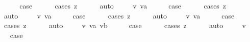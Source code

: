 \begin{isabellebody}
\ \ \isamarkupfalse%
\ \isamarkupfalse%
\ {\isacharquery}case\isanewline
\ \ \ \ \isamarkupfalse%
\ {\isacharparenleft}cases\ z{\isacharparenright}\isanewline
\ \ \ \ \isamarkupfalse%
\ auto\isanewline
{}\isamarkupfalse%
\isanewline
\ \ \isamarkupfalse%
\ {\isacharparenleft}{\isachardoublequoteopen}{}{\isacharunderscore}{}{\isachardoublequoteclose}\ v\ va{\isacharparenright}\isanewline
\ \ \isamarkupfalse%
\ \isamarkupfalse%
\ {\isacharquery}case\isanewline
\ \ \ \ \isamarkupfalse%
\ {\isacharparenleft}cases\ z{\isacharparenright}\isanewline
\ \ \ \ \isamarkupfalse%
\ auto\isanewline
{}\isamarkupfalse%
\isanewline
\ \ \isamarkupfalse%
\ {\isacharparenleft}{\isachardoublequoteopen}{}{\isacharunderscore}{}{\isachardoublequoteclose}\ v\ va{\isacharparenright}\isanewline
\ \ \isamarkupfalse%
\ \isamarkupfalse%
\ {\isacharquery}case\isanewline
\ \ \ \ \isamarkupfalse%
\ {\isacharparenleft}cases\ z{\isacharparenright}\isanewline
\ \ \ \ \isamarkupfalse%
\ auto\isanewline
{}\isamarkupfalse%
\isanewline
\ \ \isamarkupfalse%
\ {\isacharparenleft}{\isachardoublequoteopen}{}{\isacharunderscore}{}{\isachardoublequoteclose}\ v\ va{\isacharparenright}\isanewline
\ \ \isamarkupfalse%
\ \isamarkupfalse%
\ {\isacharquery}case\isanewline
\ \ \ \ \isamarkupfalse%
\ {\isacharparenleft}cases\ z{\isacharparenright}\isanewline
\ \ \ \ \isamarkupfalse%
\ auto\isanewline
{}\isamarkupfalse%
\isanewline
\ \ \isamarkupfalse%
\ {\isacharparenleft}{\isachardoublequoteopen}{}{\isacharunderscore}{}{\isachardoublequoteclose}\ v\ va\ vb{\isacharparenright}\isanewline
\ \ \isamarkupfalse%
\ \isamarkupfalse%
\ {\isacharquery}case\isanewline
\ \ \ \ \isamarkupfalse%
\ {\isacharparenleft}cases\ z{\isacharparenright}\isanewline
\ \ \ \ \isamarkupfalse%
\ auto\isanewline
{}\isamarkupfalse%
\isanewline
\ \ \isamarkupfalse%
\ {\isacharparenleft}{}\ v{\isacharparenright}\isanewline
\ \ \isamarkupfalse%
\ \isamarkupfalse%
\ {\isacharquery}case\isanewline
\ \ \ \ \isamarkupfalse%

\end{isabellebody}
